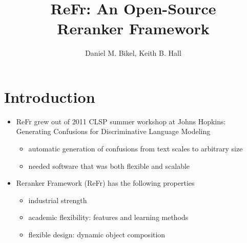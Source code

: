 \documentclass[noback,portrait,twocolumn]{cuposter}
\begin{document}



\def\bordercolor{BoundaryColor}
\def\sectionheadcolor{BrightRed}
\def\colsepcolor{BoundaryColor}

\renewcommand{\ItemizeColour}{\color{DarkRed}}


\newcommand{\clb}[1]{{\color{Red} \bf #1}}

\title{ReFr: An Open-Source \\
Reranker Framework}
\author{Daniel M. Bikel, Keith B. Hall}  
\address{Google Inc.}

\setlength{\SpaceBeforeText}{-2cm}

\makeposter

\renewcommand{\SectionColour}{\color{Blue}}
\section{Introduction}
\begin{itemize}
\item ReFr grew out of 2011 CLSP summer workshop at Johns Hopkins: \\
      Generating Confusions for Discriminative Language Modeling
  \begin{itemize}
  \item automatic generation of confusions from text scales to arbitrary size
  \item needed software that was both flexible and scalable
  \end{itemize}
\item Reranker Framework (ReFr) has the following properties
  \begin{itemize}
    \item industrial strength
    \item academic flexibility: features and learning methods
    \item flexible design: dynamic object composition
  \end{itemize}
\end{itemize}
\end{document}
